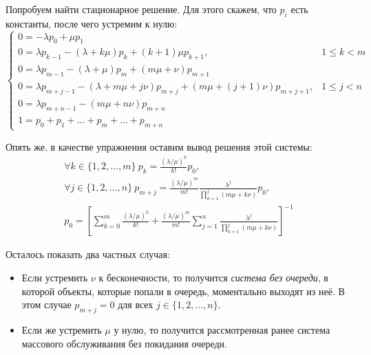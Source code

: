 Попробуем найти стационарное решение. Для этого скажем, что \(p_{i}\) есть 
константы, после чего устремим к нулю:
\[
	\begin{cases}
	0 = -\lambda p_{0} + \mu p_{1} \\
	0 = \lambda p_{k - 1} - (\lambda + k\mu)p_{k} + (k + 1)\mu p_{k + 1}, & 1 
	\leq k < m \\
	0 = \lambda p_{m - 1} - (\lambda + \mu) p_{m} + (m\mu + \nu)p_{m + 1} \\
	0 = \lambda p_{m + j - 1} - (\lambda + m\mu + j\nu)p_{m + j} + (m\mu + (j + 
	1)\nu)p_{m + j + 1}, & 1 \leq j < n \\
	0 = \lambda p_{m + n - 1} - (m\mu + n\nu)p_{m + n} \\
	1 = p_{0} + p_{1} + \ldots + p_{m} + \ldots + p_{m + n}
	\end{cases}
\]

Опять же, в качестве упражнения оставим вывод решения этой системы:
\begin{gather*}
	\forall k \in \{1, 2, \ldots, m\}\ p_{k} = 
	\frac{(\lambda/\mu)^{k}}{k!}p_{0}, \\
	\forall j \in \{1, 2, \ldots, n\}\ p_{m + j} = 
	\frac{(\lambda/\mu)^{m}}{m!}\frac{\lambda^{j}}{\prod_{k = 1}^{j}(m\mu + 
	k\nu)}p_{0}, \\
	p_{0} = \left[\sum_{k = 0}^{m}\frac{(\lambda/\mu)^{k}}{k!} + 
	\frac{(\lambda/\mu)^{m}}{m!}\sum_{j = 1}^{n}\frac{\lambda^{j}}{\prod_{k = 
	1}^{j}(m\mu + k\nu)}\right]^{-1}
\end{gather*}

Осталось показать два частных случая:
\begin{itemize}
	\item Если устремить \(\nu\) к бесконечности, то получится \emph{система 
	без очереди}, в которой объекты, которые попали в очередь, моментально 
	выходят из неё. В этом случае \(p_{m + j} = 0\) для всех \(j \in \{1, 2, 
	\ldots, n\}\).
	\item Если же устремить \(\mu\) у нулю, то получится рассмотренная ранее 
	система массового обслуживания без покидания очереди.
\end{itemize}
